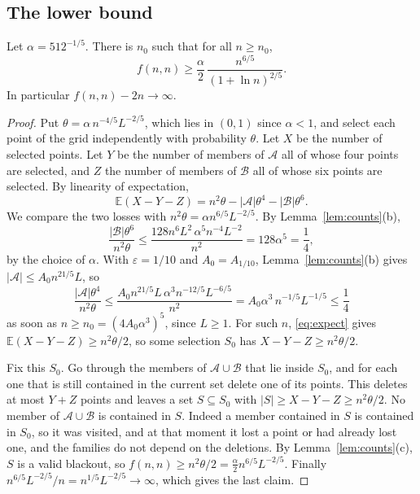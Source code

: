 \subsection{The lower bound}

\begin{theorem}\label{thm:alteration}
Let $\alpha=512^{-1/5}$. There is $n_0$ such that for all $n\ge n_0$,
\[
f(n,n)\ge\frac\alpha2\,\frac{n^{6/5}}{(1+\ln n)^{2/5}} .
\]
In particular $f(n,n)-2n\to\infty$.
\end{theorem}

\begin{proof}
Put $\theta=\alpha\,n^{-4/5}L^{-2/5}$, which lies in $(0,1)$ since $\alpha<1$, and select each point of the grid independently with probability $\theta$. Let $X$ be the number of selected points. Let $Y$ be the number of members of $\mathcal A$ all of whose four points are selected, and $Z$ the number of members of $\mathcal B$ all of whose six points are selected. By linearity of expectation,
\begin{equation}\label{eq:expect}
\mathbb E(X-Y-Z)=n^2\theta-|\mathcal A|\theta^4-|\mathcal B|\theta^6 .
\end{equation}
We compare the two losses with $n^2\theta=\alpha n^{6/5}L^{-2/5}$. By Lemma~\ref{lem:counts}(b),
\[
\frac{|\mathcal B|\theta^6}{n^2\theta}\le\frac{128n^6L^2\,\alpha^5n^{-4}L^{-2}}{n^2}=128\alpha^5=\frac14 ,
\]
by the choice of $\alpha$. With $\varepsilon=1/10$ and $A_0=A_{1/10}$, Lemma~\ref{lem:counts}(b) gives $|\mathcal A|\le A_0n^{21/5}L$, so
\[
\frac{|\mathcal A|\theta^4}{n^2\theta}\le\frac{A_0n^{21/5}L\,\alpha^3n^{-12/5}L^{-6/5}}{n^2}=A_0\alpha^3\,n^{-1/5}L^{-1/5}\le\frac14
\]
as soon as $n\ge n_0=(4A_0\alpha^3)^5$, since $L\ge1$. For such $n$, \eqref{eq:expect} gives $\mathbb E(X-Y-Z)\ge n^2\theta/2$, so some selection $S_0$ has $X-Y-Z\ge n^2\theta/2$.

Fix this $S_0$. Go through the members of $\mathcal A\cup\mathcal B$ that lie inside $S_0$, and for each one that is still contained in the current set delete one of its points. This deletes at most $Y+Z$ points and leaves a set $S\subseteq S_0$ with $|S|\ge X-Y-Z\ge n^2\theta/2$. No member of $\mathcal A\cup\mathcal B$ is contained in $S$. Indeed a member contained in $S$ is contained in $S_0$, so it was visited, and at that moment it lost a point or had already lost one, and the families do not depend on the deletions. By Lemma~\ref{lem:counts}(c), $S$ is a valid blackout, so $f(n,n)\ge n^2\theta/2=\frac\alpha2n^{6/5}L^{-2/5}$. Finally $n^{6/5}L^{-2/5}/n=n^{1/5}L^{-2/5}\to\infty$, which gives the last claim.
\end{proof}

